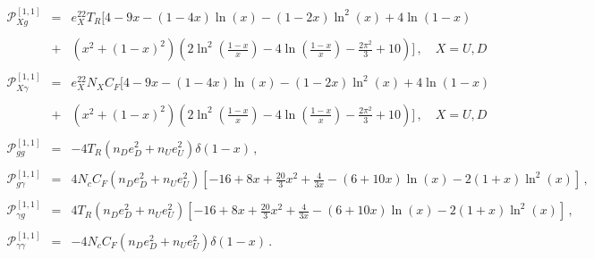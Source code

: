 \documentclass[10pt,a4paper]{article}
\begin{document}
\begin{equation}
\begin{array}{rcl}
    \displaystyle \mathcal{P}_{Xg}^{[1,1]}&=&\displaystyle
                                              e_X^22T_R\bigg[4-9x-(1-4x)\ln(x)-(1-2x)\ln^2(x)+4\ln(1-x)\\
    \\
    &+&\displaystyle (x^2+(1-x)^2)\left(2\ln^2\left(\frac{1-x}{x}\right)-4\ln\left(\frac{1-x}{x}\right)-\frac{2\pi^2}{3}+10\right)\bigg]\,,\quad X=U,D\\
    \\
        \displaystyle \mathcal{P}_{X\gamma}^{[1,1]}&=&\displaystyle e_X^22N_XC_F\bigg[4-9x-(1-4x)\ln(x)-(1-2x)\ln^2(x)+4\ln(1-x)\\
    \\
    &+&\displaystyle (x^2+(1-x)^2)\left(2\ln^2\left(\frac{1-x}{x}\right)-4\ln\left(\frac{1-x}{x}\right)-\frac{2\pi^2}{3}+10\right)\bigg]\,,\quad X=U,D\\
    \\
  \displaystyle \mathcal{P}_{gg}^{[1,1]}&=& \displaystyle-4T_R\left(n_De_D^2+n_Ue_U^2\right)\delta(1-x)\,,\\
\\
  \displaystyle \mathcal{P}_{g\gamma}^{[1,1]}&=& \displaystyle 4N_cC_F\left(n_De_D^2+n_Ue_U^2\right)\left[-16+8x+\frac{20}{3}x^2+\frac{4}{3x}-(6+10x)\ln(x)-2(1+x)\ln^2(x)\right]\,,\\
\\
  \displaystyle \mathcal{P}_{\gamma g}^{[1,1]}&=&\displaystyle 4T_R\left(n_De_D^2+n_Ue_U^2\right) \left[-16+8x+\frac{20}{3}x^2+\frac{4}{3x}-(6+10x)\ln(x)-2(1+x)\ln^2(x)\right]\,,\\
\\
  \displaystyle \mathcal{P}_{\gamma\gamma}^{[1,1]}&=&\displaystyle-4N_cC_F\left(n_De_D^2+n_Ue_U^2\right)\delta(1-x) \,.
\end{array}
\end{equation}
\end{document}
